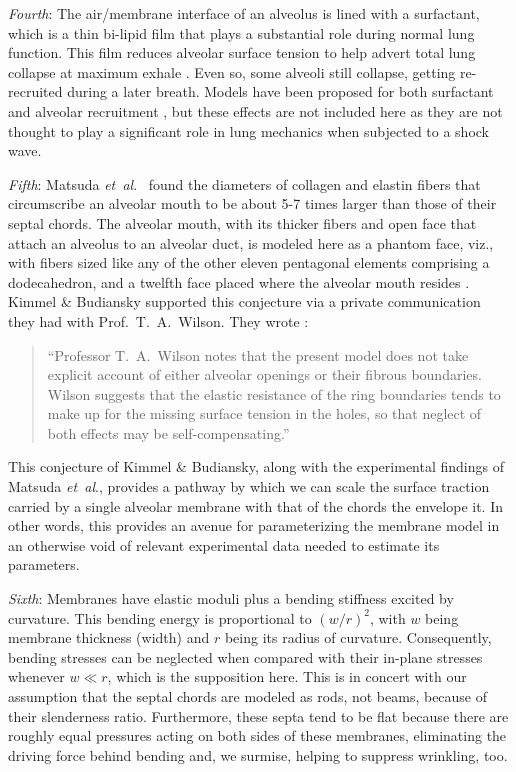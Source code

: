 \textit{Fourth\/}: The air\slash membrane interface of an alveolus is lined with a surfactant, which is a thin bi-lipid film that plays a substantial role during normal lung function.  This film reduces alveolar surface tension to help advert total lung collapse at maximum exhale \cite{Stamenovic90}.  Even so, some alveoli still collapse, getting re-recruited during a later breath.  Models have been proposed for both surfactant \cite{Hills99} and alveolar recruitment \cite{Bates07}, but these effects are not included here as they are not thought to play a significant role in lung mechanics when subjected to a shock wave. 

\textit{Fifth\/}: Matsuda \textit{et~al}.\ \cite{Matsudaetal87} found the diameters of collagen and elastin fibers that circumscribe an alveolar mouth to be about 5-7 times larger than those of their septal chords.  The alveolar mouth, with its thicker fibers and open face that attach an alveolus to an alveolar duct, is modeled here as a phantom face, viz., with fibers sized like any of the other eleven pentagonal elements comprising a dodecahedron, and a twelfth face placed where the alveolar mouth resides \cite{Freedetal12}.  Kimmel \& Budiansky supported this conjecture via a private communication they had with Prof.\ T.\ A.\ Wilson.  They wrote \cite{KimmelBudiansky90}:
\small
\begin{quote}
    ``Professor T.\ A.\ Wilson notes that the present model does not take explicit account of either alveolar openings or their fibrous boundaries.  Wilson suggests that the elastic resistance of the ring boundaries tends to make up for the missing surface tension in the holes, so that neglect of both effects may be self-compensating.''
\end{quote}
\normalsize
This conjecture of Kimmel \& Budiansky, along with the experimental findings of Matsuda \textit{et~al}., provides a pathway by which we can scale the surface traction carried by a single alveolar membrane with that of the chords the envelope it.  In other words, this provides an avenue for parameterizing the membrane model in an otherwise void of relevant experimental data needed to estimate its parameters.

\textit{Sixth\/}: Membranes have elastic moduli plus a bending stiffness excited by curvature.  This bending energy is proportional to $(w/r)^2$, with $w$ being membrane thickness (width) and $r$ being its radius of curvature.  Consequently, bending stresses can be neglected when compared with their in-plane stresses whenever $w \ll r$, which is the supposition here.  This is in concert with our assumption that the septal chords are modeled as rods, not beams, because of their slenderness ratio.  Furthermore, these septa tend to be flat because there are roughly equal pressures acting on both sides of these membranes, eliminating the driving force behind bending \cite{HoppinHildebrandt77} and, we surmise, helping to suppress wrinkling, too.

